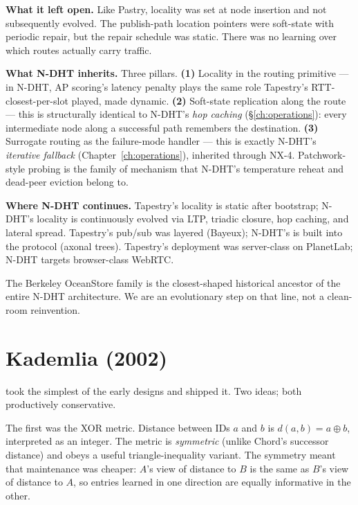 \documentclass[twoside,nobib]{tufte-book}
\newcommand{\NDHT}{N-DHT\xspace}
\begin{document}
\textbf{What it left open.} Like Pastry, locality was set at node
insertion and not subsequently evolved. The publish-path location
pointers were soft-state with periodic repair, but the repair
schedule was static. There was no learning over which routes
actually carry traffic.

\textbf{What \NDHT inherits.} Three pillars. \textbf{(1)} Locality
in the routing primitive --- in \NDHT, AP scoring's latency
penalty plays the same role Tapestry's RTT-closest-per-slot played,
made dynamic. \textbf{(2)} Soft-state replication along the route
--- this is structurally identical to \NDHT's \emph{hop caching}
(\S\ref{ch:operations}): every intermediate node along a successful
path remembers the destination. \textbf{(3)} Surrogate routing as
the failure-mode handler --- this is exactly \NDHT's
\emph{iterative fallback} (Chapter~\ref{ch:operations}), inherited
through NX-4. Patchwork-style probing is the family of mechanism
that \NDHT's temperature reheat and dead-peer eviction belong to.

\textbf{Where \NDHT continues.} Tapestry's locality is static
after bootstrap; \NDHT's locality is continuously evolved via LTP,
triadic closure, hop caching, and lateral spread. Tapestry's
pub/sub was layered (Bayeux); \NDHT's is built into the protocol
(axonal trees). Tapestry's deployment was server-class on
PlanetLab; \NDHT targets browser-class WebRTC.

The Berkeley OceanStore family is the closest-shaped historical
ancestor of the entire \NDHT architecture. We are an evolutionary
step on that line, not a clean-room reinvention.

\section{Kademlia (2002)}

 took the simplest of the early designs and shipped it. Two
ideas; both productively conservative.

The first was the XOR metric. Distance between IDs $a$ and $b$ is
$d(a, b) = a \oplus b$, interpreted as an integer. The metric is
\emph{symmetric} (unlike Chord's successor distance) and obeys a
useful triangle-inequality variant. The symmetry meant that
maintenance was cheaper: $A$'s view of distance to $B$ is the same
as $B$'s view of distance to $A$, so entries learned in one
direction are equally informative in the other.
\end{document}
